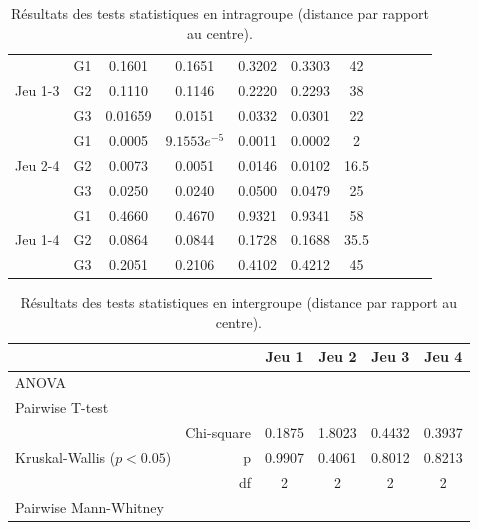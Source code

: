 {\begin{landscape}
\begin{table}[]
\begin{tabular}{ll|ccccc|cccc}
\multirow{3}{*}{Jeu 1-3} & G1 & 0.1601 & 0.1651 & 0.3202 & 0.3303 & 42 &  &  &  &  \\
 & G2 & 0.1110 & 0.1146 & 0.2220 & 0.2293 & 38 &  &  &  &  \\
 & G3 & \cellcolor{green!25} 0.01659 & \cellcolor{green!25} 0.0151 & \cellcolor{green!25} 0.0332 & \cellcolor{green!25} 0.0301 & 22 &  &  &  &  \\ \hline
\multirow{3}{*}{Jeu 2-4} & G1 & \cellcolor{green!25} 0.0005 & \cellcolor{green!25} $9.1553e^{-5}$ & \cellcolor{green!25} 0.0011 & \cellcolor{green!25} 0.0002 & 2 &  &  &  &  \\
 & G2 & \cellcolor{green!25} 0.0073 & \cellcolor{green!25} 0.0051 & \cellcolor{green!25} 0.0146 & \cellcolor{green!25} 0.0102 & 16.5 &  &  &  &  \\
 & G3 & \cellcolor{green!25} 0.0250 & \cellcolor{green!25} 0.0240 & \cellcolor{green!25} 0.0500 & \cellcolor{green!25} 0.0479 & 25 &  &  &  &  \\ \hline
\multirow{3}{*}{Jeu 1-4} & G1 & 0.4660 & 0.4670 & 0.9321 & 0.9341 & 58 &  &  &  &  \\
 & G2 & 0.0864 & 0.0844 & 0.1728 & 0.1688 & 35.5 &  &  &  &  \\
 & G3 & 0.2051 & 0.2106 & 0.4102 & 0.4212 & 45 &  &  &  &
\end{tabular}
\caption{Résultats des tests statistiques en intragroupe (distance par rapport au centre).}
\label{tab:precision_intra}
\end{table}
\end{landscape}}

\begin{table}[]
\centering
\begin{tabular}{lr|cccc}
 &  & Jeu 1 & Jeu 2 & Jeu 3 & Jeu 4 \\\hline
\multirow{2}{*}{ANOVA} &  &  &  &  &  \\
 &  &  &  &  &  \\\hline
\multirow{3}{*}{Pairwise T-test} & & & & & \\
 & & & & &  \\
 & & & & &  \\\hline
\multirow{3}{*}{Kruskal-Wallis ($p < 0.05$)} & Chi-square & 0.1875 & 1.8023 & 0.4432 & 0.3937 \\
 & p & 0.9907 & 0.4061 & 0.8012 & 0.8213 \\
 & df & 2 & 2 & 2 & 2 \\\hline
\multirow{3}{*}{Pairwise Mann-Whitney} & & & & & \\
 & & & & & \\
 & & & & &
\end{tabular}
\caption{Résultats des tests statistiques en intergroupe (distance par rapport au centre).}
\label{tab:precision_inter}
\end{table}


